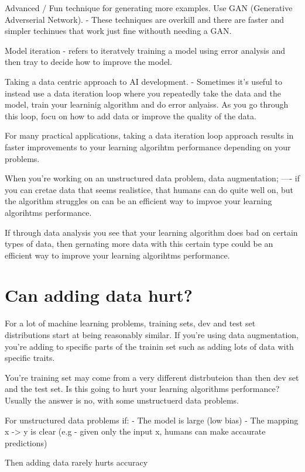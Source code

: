 Advanced / Fun technique for generating more examples. Use GAN (Generative Adverserial Network).
- These techniques are overkill and there are faster and simpler techinues that work just fine withouth needing a GAN.

Model iteration - refers to iteratvely training a model using error analysis and then tray to decide how to improve the model.



Taking a data centric approach to AI development.
- Sometimes it's useful to instead use a data iteration loop where you repeatedly take the data and the model, train your learninig algorithm and do error anlyaiss.
As you go through this loop, focu on how to add data or improve the quality of the data.

For many practical applications, taking a data iteration loop approach results in faster improvements to your learning algorihtm performance depending on your problems.

When you're working on an unstructured data problem, data augmentation; ---- if you can cretae data that seems realistice, that humans can do quite well on, but the algorithm struggles on can be an efficient way to impvoe your learning algorihtms performance.

If through data analysis you see that your learning algorithm does bad on certain types of data, then gernating more data with this certain type could be an efficient way to improve your learning algorihtms performance.

\section{Can adding data hurt?}

For a lot of machine learning problems, training sets, dev and test set distributions start at being reasonably similar.
If you're using data augmentation, you're adding to specific parts of the trainin set such as adding lots of data with specific traits.

You're training set may come from a very different distrbuteion than then dev set and the test set.
Is this going to hurt your learning algorithms performance? Usually the answer is no, with some unstructuerd data problems.


For unstructured data problems if:
- The model is large (low bias)
- The mapping x -> y is clear (e.g - given only the input x, humans can make accaurate predictions)

Then adding data rarely hurts accuracy

